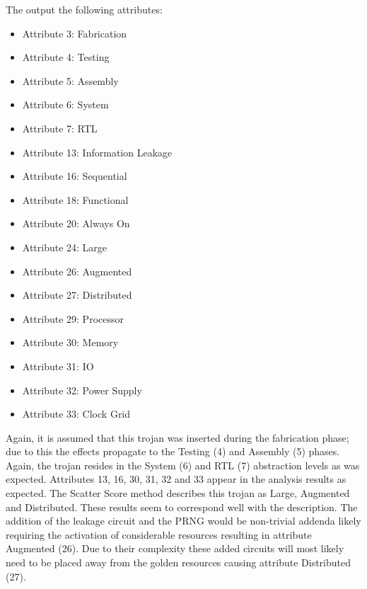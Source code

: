 The \NameNoPeriod output the following attributes:
\begin{itemize}
	\item Attribute 3: Fabrication
	\item Attribute 4: Testing
	\item Attribute 5: Assembly
	\item Attribute 6: System
	\item Attribute 7: RTL
	\item Attribute 13: Information Leakage
	\item Attribute 16: Sequential
	\item Attribute 18: Functional
	\item Attribute 20: Always On
	\item Attribute 24: Large
	\item Attribute 26: Augmented
	\item Attribute 27: Distributed
	\item Attribute 29: Processor
	\item Attribute 30: Memory
	\item Attribute 31: \acrshort{IO}
	\item Attribute 32: Power Supply
	\item Attribute 33: Clock Grid
\end{itemize}

Again, it is assumed that this trojan was inserted during the fabrication phase; due to this the effects propagate to the Testing (4) and Assembly (5) phases.
Again, the trojan resides in the System (6) and \acrshort{RTL} (7) abstraction levels as was expected.
Attributes 13, 16, 30, 31, 32 and 33 appear in the analysis results as expected.
The Scatter Score method describes this trojan as Large, Augmented and Distributed. 
These results seem to correspond well with the description. 
The addition of the leakage circuit and the PRNG would be non-trivial addenda likely requiring the activation of considerable resources resulting in attribute Augmented (26).
Due to their complexity these added circuits will most likely need to be placed away from the \gls{golden} resources causing attribute Distributed (27).